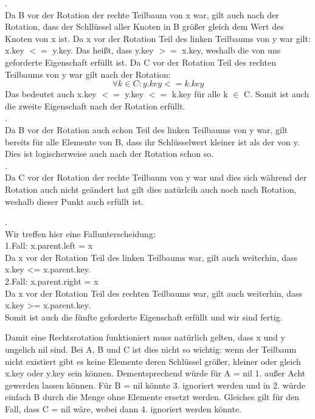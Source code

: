 \documentclass{article}
\begin{document}
\smallskip
{}. \\ 
Da B vor der Rotation der rechte Teilbaum von x war, gilt auch nach der 
Rotation, dass der Schllüssel aller Knoten in B größer gleich dem Wert 
des Knoten von x ist.
Da x vor der Rotation Teil des linken Teilbaums von y war gilt: x.key $<=$ y.key.
Das heißt, dass y.key $>=$ x.key, weshalb die von uns geforderte Eigenschaft
erfüllt ist.
Da C vor der Rotation Teil des rechten Teilbaums von y war gilt nach 
der Rotation:
\[
    \forall k \in C : y.key <= k.key
\]
Das bedeutet auch x.key $<=$ y.key $<=$ k.key für alle k $\in$ C.
Somit ist auch die zweite Eigenschaft nach der Rotation erfüllt. \\ 

\smallskip
{}. \\ 
Da B vor der Rotation auch schon Teil des linken Teilbaums von y war, 
gilt bereits für alle Elemente von B, dass ihr Schlüsselwert kleiner ist 
als der von y. Dies ist logischerweise auch nach der Rotation schon so. \\ 

\smallskip
{}. \\ 
Da C vor der Rotation der rechte Teilbaum von y war und dies sich während 
der Rotation auch nicht geändert hat gilt dies natürlcih auch noch 
nach Rotation, weshalb dieser Punkt auch erfüllt ist.

\smallskip 
{}. \\ 
Wir treffen hier eine Fallunterscheidung: \\ 
1.Fall: x.parent.left = x \\ 
Da x vor der Rotation Teil des linken Teilbaums war, gilt auch weiterhin,
dass x.key <= x.parent.key. \\ 
2.Fall: x.parent.right = x \\
Da x vor der Rotation Teil des rechten Teilbaums war, gilt auch weiterhin,
dass x.key >= x.parent.key. \\ 
Somit ist auch die fünfte geforderte Eigenschaft erfüllt und wir sind fertig.

\bigskip
\noindent Damit eine Rechtsrotation funktioniert muss natürlich gelten, dass x und y ungelich nil sind.
Bei A, B und C ist dies nicht so wichtig: wenn der Teilbaum nicht existiert gibt 
es keine Elemente deren Schlüssel größer, kleiner oder gleich x.key oder y.key sein können.
Dementsprechend würde für A = nil 1. außer Acht gewerden lassen können.
Für B = nil könnte 3. ignoriert werden und in 2. würde einfach B durch die Menge ohne Elemente 
ersetzt werden. Gleiches gilt für den Fall, dass C = nil wäre, wobei dann 4. ignoriert werden könnte.
\end{document}
